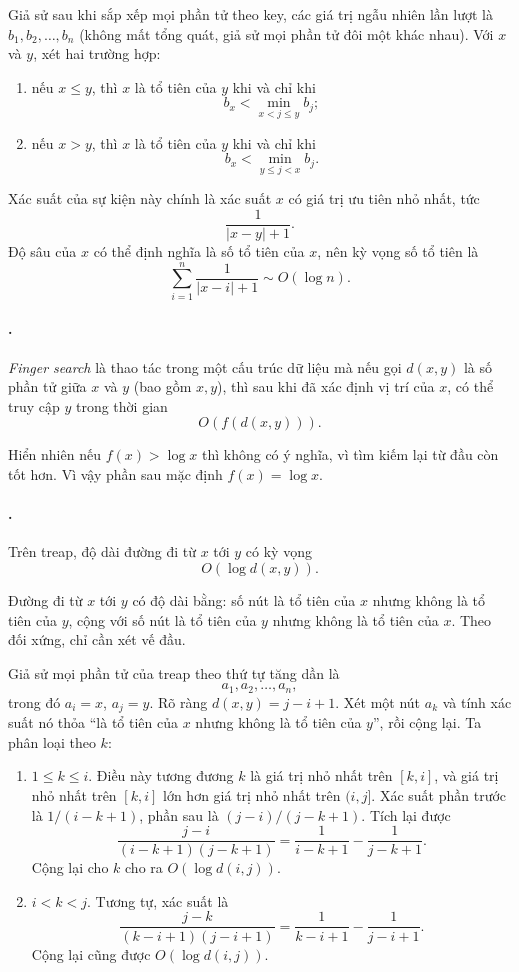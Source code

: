 \documentclass[11pt]{article}
\begin{document}
Giả sử sau khi sắp xếp mọi phần tử theo key, các giá trị ngẫu nhiên lần lượt là
\(b_1,b_2,\ldots,b_n\) (không mất tổng quát, giả sử mọi phần tử đôi một khác
nhau). Với \(x\) và \(y\), xét hai trường hợp:
\begin{enumerate}
  \item nếu \(x\le y\), thì \(x\) là tổ tiên của \(y\) khi và chỉ khi
  \[
    b_x<\min_{x<j\le y} b_j;
  \]
  \item nếu \(x>y\), thì \(x\) là tổ tiên của \(y\) khi và chỉ khi
  \[
    b_x<\min_{y\le j<x} b_j.
  \]
\end{enumerate}
Xác suất của sự kiện này chính là xác suất \(x\) có giá trị ưu tiên nhỏ nhất,
tức
\[
  \frac{1}{|x-y|+1}.
\]
Độ sâu của \(x\) có thể định nghĩa là số tổ tiên của \(x\), nên kỳ vọng số tổ
tiên là
\[
  \sum_{i=1}^{n}\frac{1}{|x-i|+1}\sim O(\log n).
\]

\paragraph{.}
\emph{Finger search} là thao tác trong một cấu trúc dữ liệu mà nếu gọi
\(d(x,y)\) là số phần tử giữa \(x\) và \(y\) (bao gồm \(x,y\)), thì sau khi đã
xác định vị trí của \(x\), có thể truy cập \(y\) trong thời gian
\[
  O(f(d(x,y))).
\]

Hiển nhiên nếu \(f(x)>\log x\) thì không có ý nghĩa, vì tìm kiếm lại từ đầu còn
tốt hơn. Vì vậy phần sau mặc định \(f(x)=\log x\).

\paragraph{.}
Trên treap, độ dài đường đi từ \(x\) tới \(y\) có kỳ vọng
\[
  O(\log d(x,y)).
\]

Đường đi từ \(x\) tới \(y\) có độ dài bằng: số nút là tổ tiên của \(x\) nhưng
không là tổ tiên của \(y\), cộng với số nút là tổ tiên của \(y\) nhưng không là
tổ tiên của \(x\). Theo đối xứng, chỉ cần xét vế đầu.

Giả sử mọi phần tử của treap theo thứ tự tăng dần là
\[
  a_1,a_2,\ldots,a_n,
\]
trong đó \(a_i=x\), \(a_j=y\). Rõ ràng \(d(x,y)=j-i+1\). Xét một nút \(a_k\)
và tính xác suất nó thỏa ``là tổ tiên của \(x\) nhưng không là tổ tiên của
\(y\)'', rồi cộng lại. Ta phân loại theo \(k\):
\begin{enumerate}
  \item \(1\le k\le i\). Điều này tương đương \(k\) là giá trị nhỏ nhất trên
  \([k,i]\), và giá trị nhỏ nhất trên \([k,i]\) lớn hơn giá trị nhỏ nhất trên
  \((i,j]\). Xác suất phần trước là \(1/(i-k+1)\), phần sau là
  \((j-i)/(j-k+1)\). Tích lại được
  \[
    \frac{j-i}{(i-k+1)(j-k+1)}
    =
    \frac{1}{i-k+1}-\frac{1}{j-k+1}.
  \]
  Cộng lại cho \(k\) cho ra \(O(\log d(i,j))\).
  \item \(i<k<j\). Tương tự, xác suất là
  \[
    \frac{j-k}{(k-i+1)(j-i+1)}
    =
    \frac{1}{k-i+1}-\frac{1}{j-i+1}.
  \]
  Cộng lại cũng được \(O(\log d(i,j))\).
\end{enumerate}
\end{document}
